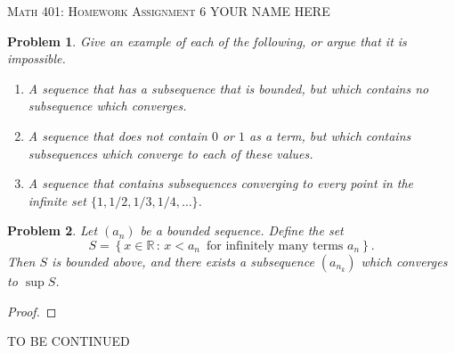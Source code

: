\documentclass[12pt]{article}
\newtheorem{problem}{Problem}
\newcommand{\RR}{\ensuremath{\mathbb R}}
\begin{document}
\small
\noindent \textsc{Math 401: Homework Assignment 6} \hfill YOUR NAME HERE

\normalsize
\bigskip

\setcounter{problem}{35}

\begin{problem} %
Give an example of each of the following, or argue that it is impossible.

\renewcommand{\labelenumi}{(\alph{enumi})}
\begin{enumerate}
\item A sequence that has a subsequence that is bounded, but which contains no subsequence which converges.


\item A sequence that does not contain $0$ or $1$ as a term, but which contains subsequences which converge to each of these values.


\item A sequence that contains subsequences converging to every point in the infinite set $\{1,1/2,1/3,1/4,\dots\}$.


\end{enumerate}
\end{problem}


\begin{problem} %
Let $(a_n)$ be a bounded sequence.  Define the set
	$$S = \left\{x\in\RR\,:\, x < a_n \,\text{ for infinitely many terms } a_n\right\}.$$
Then $S$ is bounded above, and there exists a subsequence $(a_{n_k})$ which converges to $\sup S$.
\end{problem}

\begin{proof}
\end{proof}

TO BE CONTINUED
\end{document}
